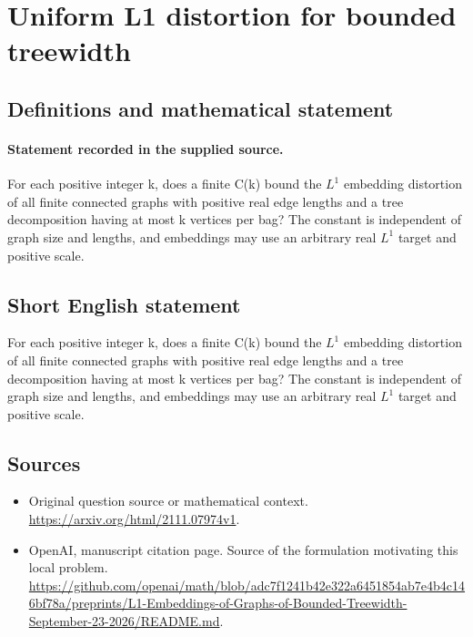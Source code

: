 \documentclass[11pt]{article}
\begin{document}
\section*{Uniform L1 distortion for bounded treewidth}\label{30007113}
\subsection{Definitions and mathematical statement}
\paragraph{Statement recorded in the supplied source.}
For each positive integer k, does a finite C(k) bound the $L^{1}$ embedding distortion of all finite connected graphs with positive real edge lengths and a tree decomposition having at most k vertices per bag? The constant is independent of graph size and lengths, and embeddings may use an arbitrary real $L^{1}$ target and positive scale.
\subsection{Short English statement}
For each positive integer k, does a finite C(k) bound the $L^{1}$ embedding distortion of all finite connected graphs with positive real edge lengths and a tree decomposition having at most k vertices per bag? The constant is independent of graph size and lengths, and embeddings may use an arbitrary real $L^{1}$ target and positive scale.
\subsection{Sources}
\begin{itemize}
\item[S1] Original question source or mathematical context.
\url{https://arxiv.org/html/2111.07974v1}.
\item[S2] OpenAI, manuscript citation page. Source of the formulation motivating this local problem.
\url{https://github.com/openai/math/blob/adc7f1241b42e322a6451854ab7e4b4c146bf78a/preprints/L1-Embeddings-of-Graphs-of-Bounded-Treewidth-September-23-2026/README.md}.
\end{itemize}
\end{document}
